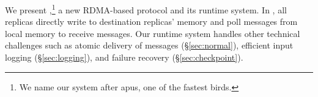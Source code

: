 %
%
%

We present \xxx,\footnote{We name our system after
apus, one of the fastest birds.} a new RDMA-based \paxos protocol and its
runtime system. In \xxx, all replicas directly write to destination
replicas' memory and poll messages from local memory to receive messages. Our 
runtime system handles other technical challenges such as atomic delivery of 
messages (\S\ref{sec:normal}), efficient input logging (\S\ref{sec:logging}), 
and failure recovery (\S\ref{sec:checkpoint}).

